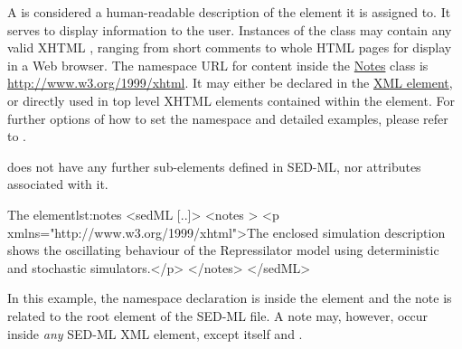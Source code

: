 \label{class:notes}

A  is considered a  human-readable description of the element it is assigned to. It serves to display information to the user. 
Instances of the  class may contain any valid XHTML \citep{P+02}, ranging from short comments to whole HTML pages for display in a Web browser. 
The namespace URL for  content inside the \hyperref[class:notes]{Notes} class is \url{http://www.w3.org/1999/xhtml}. It may either be declared in the \hyperref[class:sed-ml]{ XML element}, or directly used in top level XHTML elements contained within the   element. For further options of how to set the namespace and detailed examples, please refer to \citep[p. 14]{HBH+10}.

  does not have any further sub-elements defined in SED-ML, nor attributes associated with it.
%

%
\begin{myXmlLst}{The  element}{lst:notes}
<sedML [..]>
 <notes >
  <p xmlns="http://www.w3.org/1999/xhtml">The enclosed simulation description shows the oscillating behaviour of 
     the Repressilator model using deterministic and stochastic simulators.</p>
 </notes>
</sedML>
\end{myXmlLst}
%
In this example, the namespace declaration is inside the  element and the note is related to the  root element of the SED-ML file. A note may, however, occur inside \emph{any} SED-ML XML element, except  itself and \hyperref[class:annotation]{}.

